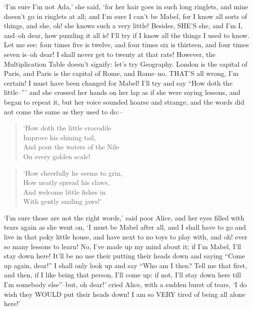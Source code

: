 \documentclass[12pt]{book}
\begin{document}
  `I'm sure I'm not Ada,' she said, `for her hair goes in such
long ringlets, and mine doesn't go in ringlets at all; and I'm
sure I can't be Mabel, for I know all sorts of things, and she,
oh! she knows such a very little!  Besides, SHE'S she, and I'm I,
and--oh dear, how puzzling it all is!  I'll try if I know all the
things I used to know.  Let me see:  four times five is twelve,
and four times six is thirteen, and four times seven is--oh dear!
I shall never get to twenty at that rate!  However, the
Multiplication Table doesn't signify:  let's try Geography.
London is the capital of Paris, and Paris is the capital of Rome,
and Rome--no, THAT'S all wrong, I'm certain!  I must have been
changed for Mabel!  I'll try and say ``How doth the little--'''
and she crossed her hands on her lap as if she were saying lessons,
and began to repeat it, but her voice sounded hoarse and
strange, and the words did not come the same as they used to do:--

\begin{verse}
            `How doth the little crocodile\\
              Improve his shining tail,\\
            And pour the waters of the Nile\\
              On every golden scale!
\end{verse}
\begin{verse}
            `How cheerfully he seems to grin,\\
              How neatly spread his claws,\\
            And welcome little fishes in\\
              With gently smiling jaws!'
\end{verse}

  `I'm sure those are not the right words,' said poor Alice, and
her eyes filled with tears again as she went on, `I must be Mabel
after all, and I shall have to go and live in that poky little
house, and have next to no toys to play with, and oh! ever so
many lessons to learn!  No, I've made up my mind about it; if I'm
Mabel, I'll stay down here!  It'll be no use their putting their
heads down and saying ``Come up again, dear!''  I shall only look
up and say ``Who am I then?  Tell me that first, and then, if I
like being that person, I'll come up:  if not, I'll stay down
here till I'm somebody else''--but, oh dear!' cried Alice, with a
sudden burst of tears, `I do wish they WOULD put their heads
down!  I am so VERY tired of being all alone here!'
\end{document}

